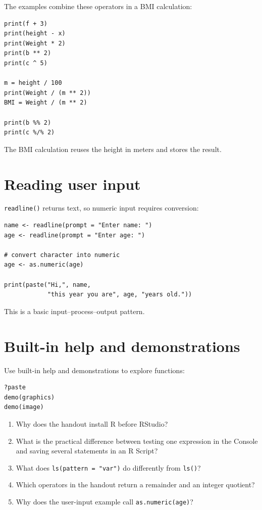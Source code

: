 The examples combine these operators in a BMI calculation:

\begin{lstlisting}[style=dsr]
print(f + 3)
print(height - x)
print(Weight * 2)
print(b ** 2)
print(c ^ 5)

m = height / 100
print(Weight / (m ** 2))
BMI = Weight / (m ** 2)

print(b %% 2)
print(c %/% 2)
\end{lstlisting}

The BMI calculation reuses the height in meters and stores the result.

\section{Reading user input}

\texttt{readline()} returns text, so numeric input requires conversion:

\begin{lstlisting}[style=dsr]
name <- readline(prompt = "Enter name: ")
age <- readline(prompt = "Enter age: ")

# convert character into numeric
age <- as.numeric(age)

print(paste("Hi,", name,
            "this year you are", age, "years old."))
\end{lstlisting}

This is a basic input--process--output pattern.

\section{Built-in help and demonstrations}

Use built-in help and demonstrations to explore functions:

\begin{lstlisting}[style=dsr]
?paste
demo(graphics)
demo(image)
\end{lstlisting}


\begin{quickcheck}
\begin{enumerate}
  \item Why does the handout install R before RStudio?
  \item What is the practical difference between testing one expression in the Console and saving several statements in an R Script?
  \item What does \texttt{ls(pattern = "var")} do differently from \texttt{ls()}?
  \item Which operators in the handout return a remainder and an integer quotient?
  \item Why does the user-input example call \texttt{as.numeric(age)}?
\end{enumerate}
\end{quickcheck}

